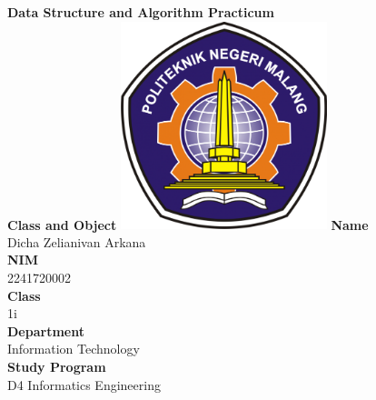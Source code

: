 \documentclass[12pt,titlepage]{article}
\newcommand{\vSubject}{Data Structure and Algorithm Practicum}
\newcommand{\vSubtitle}{Class and Object}
\newcommand{\vName}{Dicha Zelianivan Arkana}
\newcommand{\vNIM}{2241720002}
\newcommand{\vClass}{1i}
\newcommand{\vDepartment}{Information Technology}
\newcommand{\vStudyProgram}{D4 Informatics Engineering}
\begin{document}
\begin{titlepage}
    \centering
    \vfill
    {\bfseries\LARGE
        \vSubject\\
        \vskip0.25cm
        \vSubtitle
    }
    \vfill
    \includegraphics[width=6cm]{images/polinema-logo.png}
    \vfill
    {
        \textbf{Name}\\
        \vName\\
        \vskip0.5cm
        \textbf{NIM}\\
        \vNIM\\
        \vskip0.5cm
        \textbf{Class}\\
        \vClass\\
        \vskip0.5cm
        \textbf{Department}\\
        \vDepartment\\
        \vskip0.5cm
        \textbf{Study Program}\\
        \vStudyProgram
    }
\end{titlepage}
\end{document}
